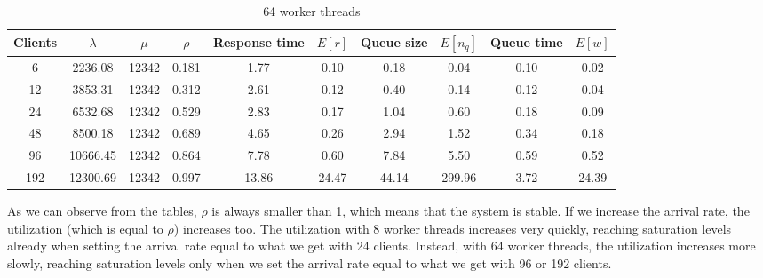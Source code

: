 \documentclass[11pt,a4paper]{article}
\begin{document}
\begin{table}[H]
\centering
\begin{tabular}{@{}c|ccc|cc|cc|cc@{}}
\toprule
Clients & $\lambda$ & $\mu$ & $\rho$ & Response time & $E[r]$ & Queue size & $E[n_q]$ & Queue time & $E[w]$ \\ \midrule
6   & 2236.08  & 12342 & 0.181 & 1.77  & 0.10  & 0.18  & 0.04   & 0.10 & 0.02 \\
12  & 3853.31  & 12342 & 0.312 & 2.61  & 0.12  & 0.40  & 0.14   & 0.12 & 0.04 \\
24  & 6532.68  & 12342 & 0.529 & 2.83  & 0.17  & 1.04  & 0.60   & 0.18 & 0.09 \\
48  & 8500.18  & 12342 & 0.689 & 4.65  & 0.26  & 2.94  & 1.52   & 0.34 & 0.18 \\
96  & 10666.45 & 12342 & 0.864 & 7.78  & 0.60  & 7.84  & 5.50   & 0.59 & 0.52 \\
192 & 12300.69 & 12342 & 0.997 & 13.86 & 24.47 & 44.14 & 299.96 & 3.72 & 24.39 \\ \bottomrule
\end{tabular}
\caption{64 worker threads}
\end{table}


As we can observe from the tables, $\rho$ is always smaller than 1, which means
that the system is stable. If we increase the arrival rate, the utilization
(which is equal to $\rho$) increases too.
The utilization with 8 worker threads increases very quickly, reaching saturation levels already
when setting the arrival rate equal to what we get with 24 clients. Instead, with 64 worker threads,
the utilization increases more slowly, reaching saturation levels only when we set the arrival
rate equal to what we get with 96 or 192 clients. 
\vspace{1em}
\end{document}
